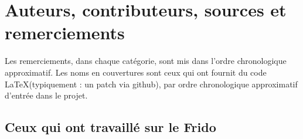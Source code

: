 \section{Auteurs, contributeurs, sources et remerciements}

Les remerciements, dans chaque catégorie, sont mis dans l'ordre chronologique approximatif. Les noms en couvertures sont ceux qui ont fournit du code \LaTeX (typiquement : un patch via github), par ordre chronologique approximatif d'entrée dans le projet.

\subsection{Ceux qui ont travaillé sur le Frido}

